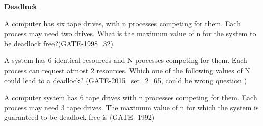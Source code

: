 \centerline{\textbf{ \LARGE Deadlock}}


\begin{questyle}

  \question  A computer has six tape drives, with n processes competing for them. Each process may need two drives.
             What is the maximum value of n for the system to be deadlock free?(GATE-1998\_32)

  \begin{oneparchoices}
  \end{oneparchoices}

  \end{questyle}




\begin{questyle}

  \question  A system has 6 identical resources and N processes competing for them. Each process can request atmost 2 resources. Which one of the following values of N could lead to a deadlock? (GATE-2015\_set\_2\_65, could be wrong question )

  \begin{oneparchoices}
  \end{oneparchoices}

  \end{questyle}




\begin{questyle}

  \question  A computer system has 6 tape drives with n processes competing for them. Each process may need 3 tape drives. The maximum value of n for which the system is guaranteed to be deadlock free is (GATE- 1992)

  \begin{oneparchoices}
  \end{oneparchoices}

  \end{questyle}



